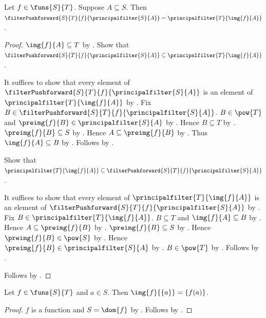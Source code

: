 \begin{theorem}\label{principal_filter_pushforward}
    Let $f\in\funs{S}{T}$.
    Suppose $A\subseteq S$.
    Then $\filterPushforward{S}{T}{f}{\principalfilter{S}{A}}
        =\principalfilter{T}{\img{f}{A}}$.
\end{theorem}
\begin{proof}
    $\img{f}{A}\subseteq T$ by .
    Show that $\filterPushforward{S}{T}{f}{\principalfilter{S}{A}}
        \subseteq\principalfilter{T}{\img{f}{A}}$.
    \begin{subproof}
        It suffices to show that every element of
            $\filterPushforward{S}{T}{f}{\principalfilter{S}{A}}$ is an
            element of $\principalfilter{T}{\img{f}{A}}$ by .
        Fix $B\in\filterPushforward{S}{T}{f}{\principalfilter{S}{A}}$.
        $B\in\pow{T}$ and $\preimg{f}{B}\in\principalfilter{S}{A}$ by
            .
        Hence $B\subseteq T$ by .
        $\preimg{f}{B}\subseteq S$ by
            .
        Hence $A\subseteq\preimg{f}{B}$ by .
        Thus $\img{f}{A}\subseteq B$ by
            .
        Follows by .
    \end{subproof}
    Show that $\principalfilter{T}{\img{f}{A}}
        \subseteq\filterPushforward{S}{T}{f}{\principalfilter{S}{A}}$.
    \begin{subproof}
        It suffices to show that every element of
            $\principalfilter{T}{\img{f}{A}}$ is an element of
            $\filterPushforward{S}{T}{f}{\principalfilter{S}{A}}$ by
            .
        Fix $B\in\principalfilter{T}{\img{f}{A}}$.
        $B\subseteq T$ and $\img{f}{A}\subseteq B$ by
            .
        Hence $A\subseteq\preimg{f}{B}$ by
            .
        $\preimg{f}{B}\subseteq S$ by
            .
        Hence $\preimg{f}{B}\in\pow{S}$ by .
        Hence $\preimg{f}{B}\in\principalfilter{S}{A}$ by
            .
        $B\in\pow{T}$ by .
        Follows by .
    \end{subproof}
    Follows by .
\end{proof}

\begin{proposition}\label{function_image_singleton}
    Let $f\in\funs{S}{T}$ and $a\in S$.
    Then $\img{f}{\{a\}}=\{f(a)\}$.
\end{proposition}
\begin{proof}
    $f$ is a function and $S=\dom{f}$ by
        .
    Follows by
        .
\end{proof}

